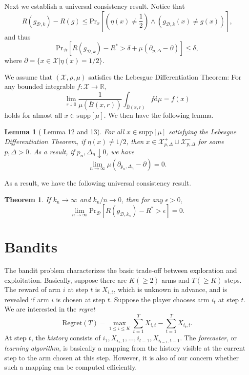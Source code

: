\documentclass[openany]{book}
\newtheorem{lemma}{Lemma}[chapter]
\newtheorem{theorem}{Theorem}[chapter]
\theoremstyle{definition}
\theoremstyle{remark}
\begin{document}
Next we establish a universal consistency result. Notice that
\begin{equation*}
    R(g_{\mathcal{D},k})-R(g)\le \mathrm{Pr}_x\left[\left(\eta(x)\ne \frac{1}{2}\right)\wedge(g_{\mathcal{D},k}(x)\ne g(x))\right],
\end{equation*}
and thus
\begin{equation*}
    \mathrm{Pr}_{\mathcal{D}}\left[R(g_{\mathcal{D},k})-R^*>\delta+\mu(\partial_{p,\Delta}\!-\partial)\right]\le\delta,
\end{equation*}
where $\partial=\{x\in \mathcal{X}|\eta(x)=1/2\}$.

We assume that $(\mathcal{X},\rho,\mu)$ satisfies the Lebesgue Differentiation Theorem: For any bounded integrable $f:\mathcal{X}\to \mathbb{R}$,
\begin{equation*}
    \lim_{r\downarrow0}\frac{1}{\mu(\bar{B}(x,r))}\int_{\bar{B}(x,r)}f \mathrm{d}\mu=f(x)
\end{equation*}
holds for almost all $x\in \mathrm{supp}[\mu]$. We then have the following lemma.
\begin{lemma}[\cite{CD14} Lemma 12 and 13]
    For all $x\in \mathrm{supp}[\mu]$ satisfying the Lebesgue Differentiation Theorem, if $\eta(x)\ne1/2$, then $x\in \mathcal{X}_{p,\Delta}^+\cup \mathcal{X}_{p,\Delta}^-$ for some $p,\Delta>0$. As a result, if $p_n,\Delta_n\downarrow0$, we have
    \begin{equation*}
        \lim_{n\to\infty}\mu(\partial_{p_n,\Delta_n}\!-\partial)=0.
    \end{equation*}
\end{lemma}
As a result, we have the following universal consistency result.
\begin{theorem}
    If $k_n\to\infty$ and $k_n/n\to0$, then for any $\epsilon>0$,
    \begin{equation*}
        \lim_{n\to\infty}\mathrm{Pr}_{\mathcal{D}}[R(g_{\mathcal{D},k_n})-R^*>\epsilon]=0.
    \end{equation*}
\end{theorem}

\part{Bandits}
The bandit problem characterizes the basic trade-off between exploration and exploitation. Basically, suppose there are $K(\ge2)$ arms and $T(\ge K)$ steps. The reward of arm $i$ at step $t$ is $X_{i,t}$, which is unknown in advance, and is revealed if arm $i$ is chosen at step $t$. Suppose the player chooses arm $i_t$ at step $t$. We are interested in the \emph{regret}
\begin{equation}\label{regret}
    \mathrm{Regret}(T)=\max_{1\le i\le K}\sum_{t=1}^{T}X_{i,t}-\sum_{t=1}^{T}X_{i_t,t}.
\end{equation}
At step $t$, the \emph{history} consists of $i_1,X_{i_1,1},\ldots,i_{t-1},X_{i_{t-1},t-1}$. The \emph{forecaster}, or \emph{learning algorithm}, is basically a mapping from the history visible at the current step to the arm chosen at this step. However, it is also of our concern whether such a mapping can be computed efficiently.
\end{document}
